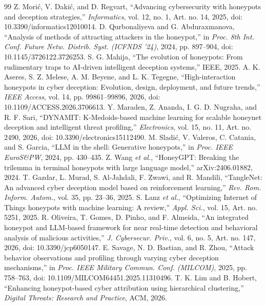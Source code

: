 \documentclass[conference]{IEEEtran}
\begin{document}
\begin{thebibliography}{99}
 Z. Mori\'c, V. Daki\'c, and D. Regvart, ``Advancing cybersecurity with honeypots and deception strategies,'' \emph{Informatics}, vol. 12, no. 1, Art. no. 14, 2025, doi: 10.3390/informatics12010014.
 D. Qurbonaliyeva and G. Abduraxmanova, ``Analysis of methods of attracting attackers in the honeypot,'' in \emph{Proc. 8th Int. Conf. Future Netw. Distrib. Syst. (ICFNDS '24)}, 2024, pp. 897--904, doi: 10.1145/3726122.3726253.
 S. G. Mahija, ``The evolution of honeypots: From rudimentary traps to AI-driven intelligent deception systems,'' IEEE, 2025.
 A. K. Aseres, S. Z. Melese, A. M. Beyene, and L. K. Tegegne, ``High-interaction honeypots in cyber deception: Evolution, design, deployment, and future trends,'' \emph{IEEE Access}, vol. 14, pp. 99861--99896, 2026, doi: 10.1109/ACCESS.2026.3706613.
 Y. Maraden, Z. Ananda, I. G. D. Nugraha, and R. F. Sari, ``DYNAMIT: K-Medoids-based machine learning for scalable honeynet deception and intelligent threat profiling,'' \emph{Electronics}, vol. 15, no. 11, Art. no. 2490, 2026, doi: 10.3390/electronics15112490.
 M. Sladi\'c, V. Valeros, C. Catania, and S. Garcia, ``LLM in the shell: Generative honeypots,'' in \emph{Proc. IEEE EuroS\&PW}, 2024, pp. 430--435.
 Z. Wang \emph{et al.}, ``HoneyGPT: Breaking the trilemma in terminal honeypots with large language model,'' arXiv:2406.01882, 2024.
 T. Gazdar, L. Murad, S. Al-Jahdali, F. Zwawi, and R. Mandili, ``TangleNet: An advanced cyber deception model based on reinforcement learning,'' \emph{Rev. Rom. Inform. Autom.}, vol. 35, pp. 23--36, 2025.
 S. Lanz \emph{et al.}, ``Optimizing Internet of Things honeypots with machine learning: A review,'' \emph{Appl. Sci.}, vol. 15, Art. no. 5251, 2025.
 R. Oliveira, T. Gomes, D. Pinho, and F. Almeida, ``An integrated honeypot and LLM-based framework for near real-time detection and behavioral analysis of malicious activities,'' \emph{J. Cybersecur. Priv.}, vol. 6, no. 5, Art. no. 147, 2026, doi: 10.3390/jcp6050147.
 E. Savage, N. D. Bastian, and R. Zhou, ``Attack behavior observations and profiling through varying cyber deception mechanisms,'' in \emph{Proc. IEEE Military Commun. Conf. (MILCOM)}, 2025, pp. 758--763, doi: 10.1109/MILCOM64451.2025.11310496.
 T. K. Lim and B. Hobert, ``Enhancing honeypot-based cyber attribution using hierarchical clustering,'' \emph{Digital Threats: Research and Practice}, ACM, 2026.

\end{thebibliography}
\end{document}

